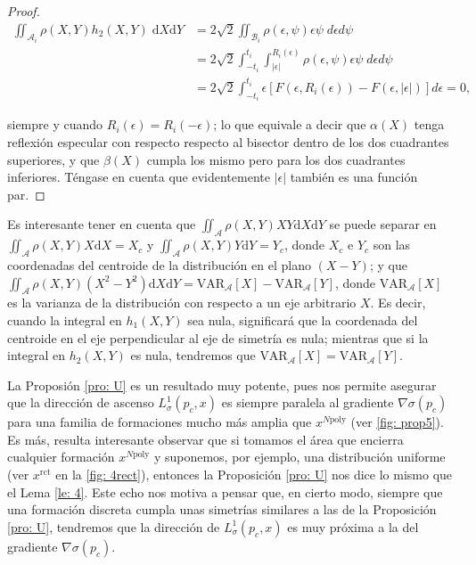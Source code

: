 \begin{proof}
\begin{align*}
\iint_{\mathcal{A}_i} \rho(X,Y) h_2(X,Y) \; \mathrm{d}X \mathrm{d}Y
&= 
2 \sqrt{2} \iint_{\mathcal{B}_i} \rho(\epsilon,\psi) \epsilon \psi \; d\epsilon d\psi
\\ &= 
2 \sqrt{2} \int_{-t_i}^{t_i}\int_{|\epsilon|}^{R_i(\epsilon)} \rho(\epsilon,\psi) \epsilon \psi \; d\epsilon d\psi
\\ &= 
2 \sqrt{2} \int_{-t_i}^{t_i} \epsilon \left [F(\epsilon,R_i(\epsilon)) - F(\epsilon,|\epsilon|) \right ] d\epsilon
= 0,
\end{align*}

\newpage
siempre y cuando $R_i(\epsilon) = R_i(-\epsilon)$; lo que equivale a decir que $\alpha(X)$ tenga reflexión especular con respecto respecto al bisector dentro de los dos cuadrantes superiores, y que $\beta(X)$ cumpla los mismo pero para los dos cuadrantes inferiores. Téngase en cuenta que evidentemente $|\epsilon|$ también es una función par.

\end{proof}

Es interesante tener en cuenta que $\iint_\mathcal{A} \rho(X,Y)XY \mathrm{d}X\mathrm{d}Y$ se puede separar en $\iint_\mathcal{A} \rho(X,Y)X \mathrm{d}X = X_{c}$ y $\iint_\mathcal{A} \rho(X,Y)Y \mathrm{d}Y = Y_{c}$, donde $X_c$ e $Y_c$ son las coordenadas del centroide de la distribución en el plano $(X-Y)$; y que $\iint_\mathcal{A} \rho(X,Y)(X^2 - Y^2) \mathrm{d}X\mathrm{d}Y = \text{VAR}_\mathcal{A}[X] - \text{VAR}_\mathcal{A}[Y]$, donde $\text{VAR}_\mathcal{A}[X]$ es la varianza de la distribución con respecto a un eje arbitrario $X$. Es decir, cuando la integral en $h_1(X,Y)$ sea nula, significará que la coordenada del centroide en el eje perpendicular al eje de simetría es nula; mientras que si la integral en $h_2(X,Y)$ es nula, tendremos que $\text{VAR}_\mathcal{A}[X] = \text{VAR}_\mathcal{A}[Y]$.

La Proposión \ref{pro: U} es un resultado muy potente, pues nos permite asegurar que la dirección de ascenso $L_\sigma^1(p_c, x)$ es siempre paralela al gradiente $\nabla\sigma(p_c)$ para una familia de formaciones mucho más amplia que $x^{N\text{poly}}$ (ver \autoref{fig: prop5}). Es más, resulta interesante observar que si tomamos el área que encierra cualquier formación $x^{N\text{poly}}$ y suponemos, por ejemplo, una distribución uniforme (ver $x^{\text{rct}}$ en la \autoref{fig: 4rect}), entonces la Proposición \ref{pro: U} nos dice lo mismo que el Lema \ref{le: 4}. Este echo nos motiva a pensar que, en cierto modo, siempre que una formación discreta cumpla unas simetrías similares a las de la Proposición \ref{pro: U}, tendremos que la dirección de $L_\sigma^1(p_c, x)$ es muy próxima a la del gradiente $\nabla\sigma(p_c)$.

